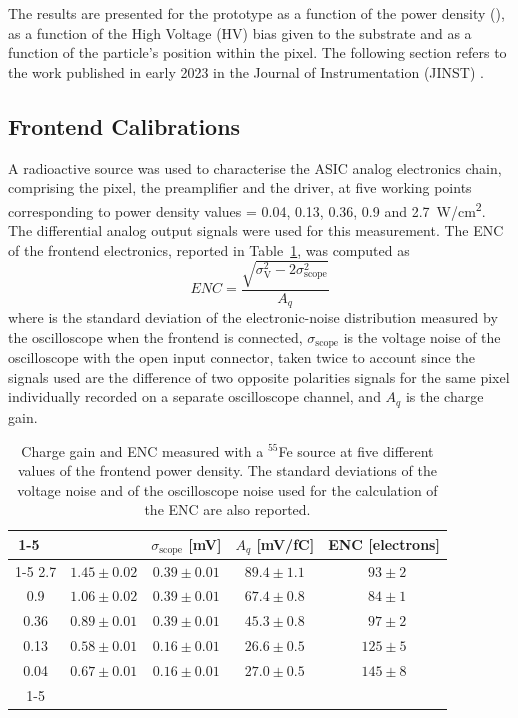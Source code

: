 	The results are presented for the prototype as a function of the power density (\power), as a function of the High Voltage (HV) bias given to the substrate and as a function of the particle's position within the pixel. The following section refers to the work published in early 2023 in the Journal of Instrumentation (JINST) \cite{MONOLITH_proto2_20ps}.
		
		\subsection{Frontend Calibrations}
		A radioactive \Fe source was used to characterise the ASIC analog electronics chain, comprising the pixel, the preamplifier and the driver, at five working points corresponding to power density values \power = 0.04, 0.13, 0.36, 0.9 and \SI{2.7}{\watt/\centi\meter^2}. The differential analog output signals were used for this measurement.
		The ENC of the frontend electronics, reported in Table~\ref{tab:MONO_gain}, was computed as 
		\begin{equation}
			ENC = \frac{\sqrt{\sigma_{\text{V}}^2 -2\sigma_{\text{scope}}^2}}{A_q}
		\end{equation}
		where \noise is the standard deviation of the electronic-noise distribution measured by the oscilloscope when the frontend is connected, $\sigma_{\text{scope}}$ is the voltage noise of the oscilloscope with the open input connector, taken twice to account since the signals used are the difference of two opposite polarities signals for the same pixel individually recorded on a separate oscilloscope channel, and $A_q$ is the charge gain.
		
		\begin{table}[h]
			\centering
			\renewcommand{\arraystretch}{1.3}
			\begin{tabular}{|c|c|c|c|c|}
			\cline{1-5}
			\cline{1-5}
			\ \textbf{\power [W/cm$^2$]} &  \textbf{\noise [mV]} & \textbf{$\sigma_{\text{scope}}$ [mV]} & \textbf{$A_q$ [mV/fC]} & \textbf{ENC [electrons]} \\
			\cline{1-5}
			2.7   & $ 1.45 \pm 0.02 $ & $ 0.39\pm0.01 $ & $89.4 \pm 1.1 $ & $~~93\pm2$ \\
			0.9   & $ 1.06 \pm 0.02 $ & $ 0.39\pm0.01 $ & $67.4 \pm 0.8 $ & $~~84\pm1$ \\
			0.36  & $ 0.89 \pm 0.01 $ & $ 0.39\pm0.01 $ & $45.3 \pm 0.8 $ & $~~97\pm2$ \\
			0.13  & $ 0.58 \pm 0.01 $ & $ 0.16\pm0.01 $ & $26.6 \pm 0.5 $ & $ 125\pm5$ \\
			0.04  & $ 0.67 \pm 0.01 $ & $ 0.16\pm0.01 $ & $27.0 \pm 0.5 $ & $ 145\pm8$ \\
			\cline{1-5}
			\end{tabular}
			\caption{Charge gain and ENC measured with a $^{55}$Fe source at five different values of the frontend power density. The standard deviations  of the voltage noise and of the oscilloscope noise used for the calculation of the ENC are also reported.}
			\label{tab:MONO_gain} 
		\end{table}

